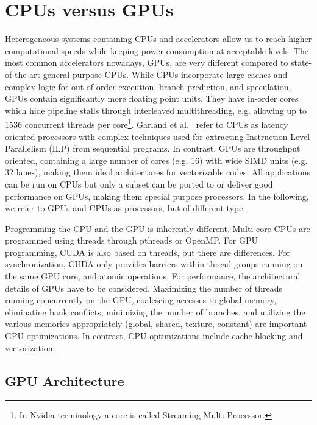 \section{CPUs versus GPUs}
Heterogeneous systems containing CPUs and accelerators allow us to reach higher computational speeds while keeping power consumption at acceptable levels. The most common accelerators nowadays, GPUs, are very different compared to state-of-the-art general-purpose CPUs. While CPUs incorporate large caches and complex logic for out-of-order execution, branch prediction, and speculation, GPUs contain significantly more floating point units. They have in-order cores which hide pipeline stalls through interleaved multithreading, e.g. allowing up to 1536 concurrent threads per core\footnote{In Nvidia terminology a core is called Streaming Multi-Processor.}.
Garland et al.~\cite{garland2010} refer to CPUs as latency oriented processors with complex techniques used for extracting Instruction Level Parallelism (ILP) from sequential programs. In contrast, GPUs are throughput oriented, containing a large number of cores (e.g. 16) with wide SIMD units (e.g. 32 lanes), making them ideal architectures for vectorizable codes. All applications can be run on CPUs but only a subset can be ported to or deliver good performance on GPUs, making them special purpose processors. In the following, we refer to GPUs and CPUs as processors, but of different type.

Programming the CPU and the GPU is inherently different. 
Multi-core CPUs are programmed using threads through pthreads or OpenMP.
For GPU programming, CUDA is also based on threads,
but there are differences. For synchronization,
CUDA only provides barriers within thread groups running on the same GPU core, and atomic operations. For performance, the architectural details of GPUs have to be considered.
Maximizing the number of threads running concurrently on the GPU, coalescing accesses to global memory, eliminating bank conflicts, minimizing the number of branches, and utilizing the various memories appropriately (global, shared, texture, constant) are important GPU optimizations.
In contrast, CPU optimizations include cache blocking and vectorization.

\subsection{GPU Architecture}

